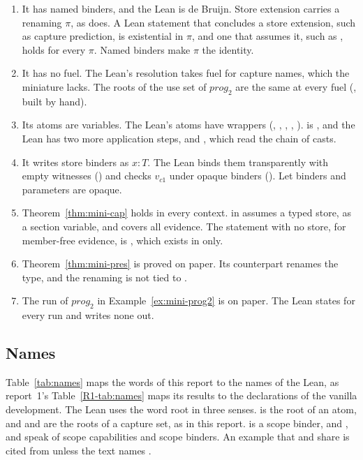 \begin{enumerate}
\item It has named binders, and the Lean is de Bruijn. Store extension carries a renaming $\pi$, as  does. A Lean statement that concludes a store extension, such as capture prediction, is existential in $\pi$, and one that assumes it, such as , holds for every $\pi$. Named binders make $\pi$ the identity.
\item It has no fuel. The Lean's resolution takes fuel for capture names, which the miniature lacks. The roots of the use set of $\mathit{prog}_2$ are the same at every fuel (, built by hand).
\item Its atoms are variables. The Lean's atoms have wrappers (, , , , ).  is , and the Lean has two more application steps,  and , which read the chain of casts.
\item It writes store binders as $x : T$. The Lean binds them transparently with empty witnesses () and checks $v_{c1}$ under opaque binders (). Let binders and parameters are opaque.
\item Theorem~\ref{thm:mini-cap} holds in every context.  in \treeK assumes a typed store, as a section variable, and covers all evidence. The statement with no store, for member-free evidence, is , which exists in \treeCC only.
\item Theorem~\ref{thm:mini-pres} is proved on paper. Its counterpart  renames the type, and the renaming is not tied to .
\item The run of $\mathit{prog}_2$ in Example~\ref{ex:mini-prog2} is on paper. The Lean states  for every run and writes none out.
\end{enumerate}

\subsection{Names}\label{sec:mech-names}

Table~\ref{tab:names} maps the words of this report to the names of the Lean, as report~1's Table~\ref{R1-tab:names} maps its results to the declarations of the vanilla development. The Lean uses the word root in three senses.  is the root of an atom, and  and  are the roots of a capture set, as in this report.  is a scope binder, and ,  and  speak of scope capabilities and scope binders. An example that \treeCC and \treeCL share is cited from \treeCC unless the text names \treeCL.

